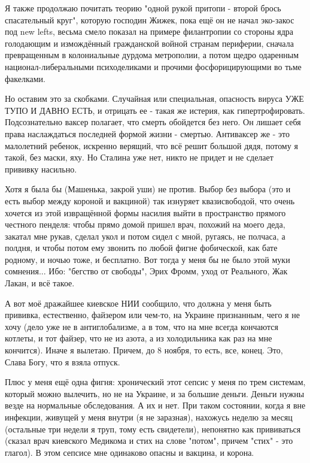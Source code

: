 Я также продолжаю почитать теорию "одной рукой притопи - второй брось
спасательный круг", которую господин Жижек, пока ещё он не начал эко-закос под
new lefts, весьма смело показал на примере филантропии со стороны ядра
голодающим и измождённый гражданской войной странам периферии, сначала
превращенным в колониальные дурдома метрополии, а потом щедро одаренным
национал-либеральными психоделиками и прочими фосфорицирующими во тьме
факелками. 

Но оставим это за скобками. Случайная или специальная, опасность вируса УЖЕ
ТУПО И ДАВНО ЕСТЬ, и отрицать ее - такая же истерия, как гипертрофировать.
Подсознательно ваксер полагает, что смерть обойдется без него. Он лишает себя
права наслаждаться последней формой жизни - смертью. Антиваксер же - это
малолетний ребенок, искренно верящий, что всё решит большой дядя, потому я
такой, без маски, яху. Но Сталина уже нет, никто не придет и не сделает
прививку насильно. 

Хотя я была бы (Машенька, закрой уши) не против. Выбор без выбора (это и есть
выбор между короной и вакциной) так изнуряет квазисвободой, что очень хочется
из этой извращённой формы насилия выйти в пространство прямого честного
пенделя: чтобы прямо домой пришел врач, похожий на моего деда, закатал мне
рукав, сделал укол и потом сидел с мной, ругаясь, не полчаса, а полдня, и чтобы
потом ему звонить по любой фигне фобической, как бате родному, и ночью тоже, и
бесплатно. Вот тогда у меня бы не было этой муки сомнения... Ибо: "бегство от
свободы", Эрих Фромм, уход от Реального, Жак Лакан, и всё такое. 

А вот моё дражайшее киевское НИИ сообщило, что должна у меня быть прививка,
естественно, файзером или чем-то, на Украине признанным, чего я не хочу (дело
уже не в антиглобализме, а в том, что на мне всегда кончаются котлеты, и тот
файзер, что не из азота, а из холодильника как раз на мне кончится). Иначе я
вылетаю. Причем, до 8 ноября, то есть, все, конец. Это, Слава Богу, что я взяла
отпуск.

Плюс у меня ещё одна фигня: хронический этот сепсис у меня по трем системам,
который можно вылечить, но не на Украине, и за большие деньги. Деньги нужны
везде на нормальные обследования. А их и нет. При таком состоянии, когда я вне
инфекции, живущей у меня внутри (я не заразная), нахожусь неделю за месяц
(остальные три недели я труп, тому есть свидетели), непонятно как прививаться
(сказал врач киевского Медикома и стих на слове "потом", причем "стих" - это
глагол). В этом сепсисе мне одинаково опасны и вакцина, и корона.

